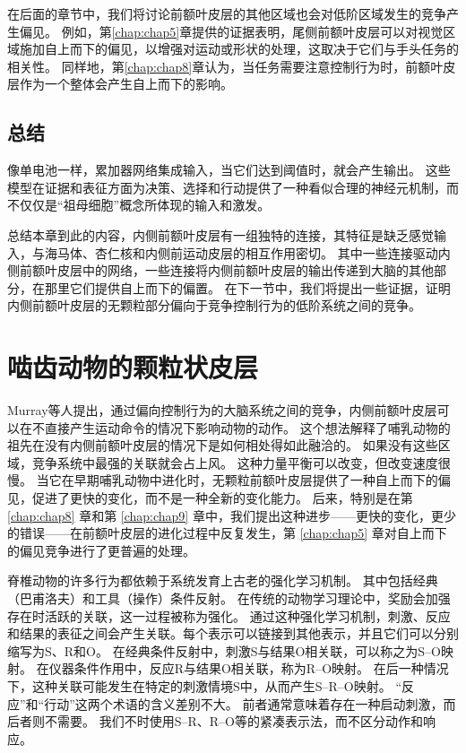 在后面的章节中，我们将讨论前额叶皮层的其他区域也会对低阶区域发生的竞争产生偏见。
例如，第\ref{chap:chap5}章提供的证据表明，尾侧前额叶皮层可以对视觉区域施加自上而下的偏见，以增强对运动或形状的处理，这取决于它们与手头任务的相关性。
同样地，第\ref{chap:chap8}章认为，当任务需要注意控制行为时，前额叶皮层作为一个整体会产生自上而下的影响。\par



\subsection{总结}

像单电池一样，累加器网络集成输入，当它们达到阈值时，就会产生输出。
这些模型在证据和表征方面为决策、选择和行动提供了一种看似合理的神经元机制，而不仅仅是“祖母细胞”概念所体现的输入和激发。\par


总结本章到此的内容，内侧前额叶皮层有一组独特的连接，其特征是缺乏感觉输入，与海马体、杏仁核和内侧前运动皮层的相互作用密切。
其中一些连接驱动内侧前额叶皮层中的网络，一些连接将内侧前额叶皮层的输出传递到大脑的其他部分，在那里它们提供自上而下的偏置。
在下一节中，我们将提出一些证据，证明内侧前额叶皮层的无颗粒部分偏向于竞争控制行为的低阶系统之间的竞争。\par



\section{啮齿动物的颗粒状皮层}

Murray等人\cite{murray2011can}提出，通过偏向控制行为的大脑系统之间的竞争，内侧前额叶皮层可以在不直接产生运动命令的情况下影响动物的动作。
这个想法解释了哺乳动物的祖先在没有内侧前额叶皮层的情况下是如何相处得如此融洽的。
 如果没有这些区域，竞争系统中最强的关联就会占上风。 这种力量平衡可以改变，但改变速度很慢。
当它在早期哺乳动物中进化时，无颗粒前额叶皮层提供了一种自上而下的偏见，促进了更快的变化，而不是一种全新的变化能力。
后来，特别是在第 \ref{chap:chap8} 章和第 \ref{chap:chap9} 章中，我们提出这种进步——更快的变化，更少的错误——在前额叶皮层的进化过程中反复发生，第 \ref{chap:chap5} 章对自上而下的偏见竞争进行了更普遍的处理。\par


脊椎动物的许多行为都依赖于系统发育上古老的强化学习机制。
其中包括经典（巴甫洛夫）和工具（操作）条件反射\cite{Dickinson 1980}。
在传统的动物学习理论中，奖励会加强存在时活跃的关联，这一过程被称为强化。
通过这种强化学习机制，刺激、反应和结果的表征之间会产生关联。每个表示可以链接到其他表示，并且它们可以分别缩写为S、R和O。
在经典条件反射中，刺激S与结果O相关联，可以称之为S–O映射。
在仪器条件作用中，反应R与结果O相关联，称为R–O映射。
在后一种情况下，这种关联可能发生在特定的刺激情境S中，从而产生S–R–O映射。
“反应”和“行动”这两个术语的含义差别不大。
前者通常意味着存在一种启动刺激，而后者则不需要。
我们不时使用S–R、R–O等的紧凑表示法，而不区分动作和响应。\par


